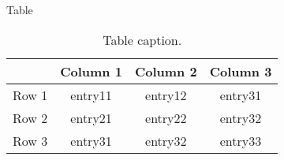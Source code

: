 \documentclass{beamer}
\begin{document}
\begin{frame}{Table}
    \begin{table}
        \centering
        \begin{tabular}{rccc}
             & Column 1 & Column 2 & Column 3 \\\hline
            Row 1 & entry11 & entry12 & entry31 \\
            Row 2 & entry21 & entry22 & entry32 \\
            Row 3 & entry31 & entry32 & entry33 \\
        \end{tabular}
        \caption{Table caption.}
        \label{table demo}
    \end{table}
\end{frame}
\end{document}
